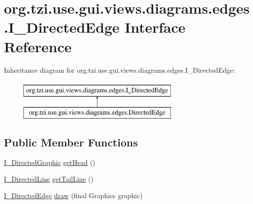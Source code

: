 \hypertarget{interfaceorg_1_1tzi_1_1use_1_1gui_1_1views_1_1diagrams_1_1edges_1_1_i___directed_edge}{\section{org.\-tzi.\-use.\-gui.\-views.\-diagrams.\-edges.\-I\-\_\-\-Directed\-Edge Interface Reference}
\label{interfaceorg_1_1tzi_1_1use_1_1gui_1_1views_1_1diagrams_1_1edges_1_1_i___directed_edge}
}
Inheritance diagram for org.\-tzi.\-use.\-gui.\-views.\-diagrams.\-edges.\-I\-\_\-\-Directed\-Edge\-:\begin{figure}[H]
\begin{center}
\leavevmode
\includegraphics[height=2.000000cm]{interfaceorg_1_1tzi_1_1use_1_1gui_1_1views_1_1diagrams_1_1edges_1_1_i___directed_edge}
\end{center}
\end{figure}
\subsection*{Public Member Functions}
\begin{DoxyCompactItemize}
\item 
\hyperlink{interfaceorg_1_1tzi_1_1use_1_1gui_1_1views_1_1diagrams_1_1util_1_1_i___directed_graphic}{I\-\_\-\-Directed\-Graphic} \hyperlink{interfaceorg_1_1tzi_1_1use_1_1gui_1_1views_1_1diagrams_1_1edges_1_1_i___directed_edge_ae1ae6818accf2aa92a3837a78fb17de2}{get\-Head} ()
\item 
\hyperlink{interfaceorg_1_1tzi_1_1use_1_1gui_1_1views_1_1diagrams_1_1util_1_1_i___directed_line}{I\-\_\-\-Directed\-Line} \hyperlink{interfaceorg_1_1tzi_1_1use_1_1gui_1_1views_1_1diagrams_1_1edges_1_1_i___directed_edge_ad4d00a40de7e109e25619bf7c0d7d312}{get\-Tail\-Line} ()
\item 
\hyperlink{interfaceorg_1_1tzi_1_1use_1_1gui_1_1views_1_1diagrams_1_1edges_1_1_i___directed_edge}{I\-\_\-\-Directed\-Edge} \hyperlink{interfaceorg_1_1tzi_1_1use_1_1gui_1_1views_1_1diagrams_1_1edges_1_1_i___directed_edge_a94bc63a27f98b9c2fdae628911296d4f}{draw} (final Graphics graphic)
\end{DoxyCompactItemize}


